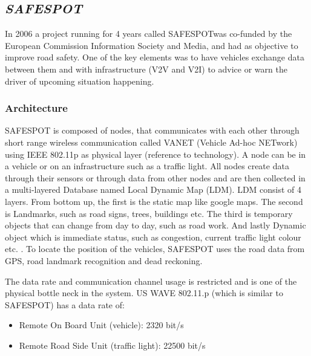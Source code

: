\subsection{\textit{SAFESPOT}}
In 2006 a project running for 4 years called SAFESPOT\footnotemark was co-funded by the European Commission Information Society and Media, and had as objective to improve road safety. One of the key elements was to have vehicles exchange data between them and with infrastructure (V2V and V2I) to advice or warn the driver of upcoming situation happening.\par
% 
% 
\subsubsection{Architecture}
SAFESPOT is composed of nodes, that communicates with each other through short range wireless communication called VANET (Vehicle Ad-hoc NETwork) using IEEE 802.11p as physical layer (reference to technology). A node can be in a vehicle or on an infrastructure such as a traffic light. All nodes create data through their sensors or through data from other nodes and are then collected in a multi-layered Database named Local Dynamic Map (LDM).
LDM consist of 4 layers. From bottom up, the first is the static map like google maps. The second is Landmarks, such as road signs, trees, buildings etc. The third is temporary objects that can change from day to day, such as road work. And lastly Dynamic object which is immediate status, such as congestion, current traffic light colour etc. \cite{Brignolo2008UseProject}.
To locate the position of the vehicles, SAFESPOT uses the road data from GPS, road landmark recognition and dead reckoning\footnotemark.\par
%
% 
% 
% 
The data rate and communication channel usage is restricted and is one of the physical bottle neck in the system. US WAVE 802.11.p (which is similar to SAFESPOT) has a data rate of:
\begin{itemize}
    \item Remote On Board Unit (vehicle): 2320 bit/s
    \item Remote Road Side Unit (traffic light): 22500 bit/s  
\end{itemize}
